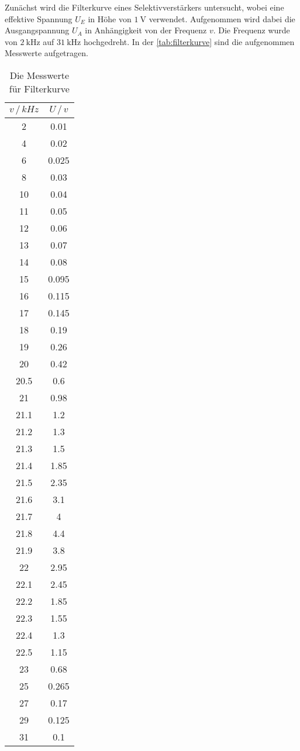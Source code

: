 Zunächst wird die Filterkurve eines Selektivverstärkers untersucht, wobei eine effektive Spannung $U_E$ in Höhe von $ \SI{1}{\volt}$ 
verwendet. Aufgenommen wird dabei die Ausgangspannung $U_A$ in Anhängigkeit von der Frequenz $v$. Die Frequenz wurde von $\SI{2}{\kHz}$ auf 
$\SI{31}{\kHz}$ hochgedreht. In der \eqref{tab:filterkurve} sind die aufgenommen Messwerte aufgetragen.

\begin{table}[H]
    \centering
    \caption{Die Messwerte für Filterkurve}
    \label{tab:filterkurve}
\begin{tabular}{c c}
    \toprule
          $v \, /\,\si{kHz}$ & $U \,/\,\si{v}$ \\
    \midrule
           2 &    0.01 \\
           4 &    0.02 \\
           6 &   0.025 \\
           8 &    0.03 \\
          10 &    0.04 \\
          11 &    0.05 \\
          12 &    0.06 \\
          13 &    0.07 \\
          14 &    0.08 \\
          15 &   0.095 \\
          16 &   0.115 \\
          17 &   0.145 \\
          18 &    0.19 \\
          19 &    0.26 \\
          20 &    0.42 \\
        20.5 &     0.6 \\
          21 &    0.98 \\
        21.1 &     1.2 \\
        21.2 &     1.3 \\
        21.3 &     1.5 \\
        21.4 &    1.85 \\
        21.5 &    2.35 \\
        21.6 &     3.1 \\
        21.7 &       4 \\
        21.8 &     4.4 \\
        21.9 &     3.8 \\
          22 &    2.95 \\
        22.1 &    2.45 \\
        22.2 &    1.85 \\
        22.3 &    1.55 \\
        22.4 &     1.3 \\
        22.5 &    1.15 \\
          23 &    0.68 \\
          25 &   0.265 \\
          27 &    0.17 \\
          29 &   0.125 \\
          31 &    0.1 \\
    \bottomrule
    \end{tabular}
\end{table}

